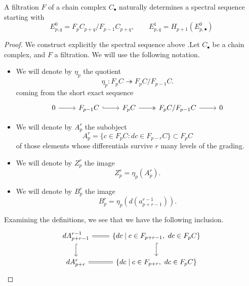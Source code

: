 \documentclass[main.tex]{subfiles}
\begin{document}
\begin{theorem}
  A filtration $F$ of a chain complex $C_{\bullet}$ naturally determines a spectral sequence starting with
  \begin{equation*}
    E^{0}_{p,q} = F_{p}C_{p+q}/F_{p-1}C_{p+q},\qquad E^{1}_{p,q} = H_{p+1}(E^{0}_{p,
    \bullet})
  \end{equation*}
\end{theorem}
\begin{proof}
  We construct explicitly the spectral sequence above .Let $C_{\bullet}$ be a chain complex, and $F$ a filtration. We will use the following notation.
  \begin{itemize}
    \item We will denote by $\eta_{p}$ the quotient
      \begin{equation*}
        \eta_{p}\colon F_{p}C \twoheadrightarrow F_{p}C/F_{p-1}C.
      \end{equation*}
      coming from the short exact sequence
      \begin{equation*}
        \begin{tikzcd}
          0
          \arrow[r]
          & F_{p-1}C
          \arrow[r, hook]
          & F_{p}C
          \arrow[r, two heads]
          & F_{p}C/F_{p-1}C
          \arrow[r]
          & 0
        \end{tikzcd}
      \end{equation*}

    \item We will denote by $A^{r}_{p}$ the subobject
      \begin{equation*}
        A^{r}_{p} = \{c \in F_{p}C\colon dc \in F_{p-r}C\} \subset F_{p}C
      \end{equation*}
      of those elements whose differentials survive $r$ many levels of the grading.

    \item We will denote by $Z^{r}_{p}$ the image
      \begin{equation*}
        Z^{r}_{p} = \eta_{p}(A^{r}_{p}).
      \end{equation*}

    \item We will denote by $B^{r}_{p}$ the image
      \begin{equation*}
        B^{r}_{p} = \eta_{p}(d(a^{r-1}_{p+r-1})).
      \end{equation*}
  \end{itemize}

  Examining the definitions, we see that we have the following inclusion.
  \begin{equation*}
    \begin{tikzcd}
      dA^{r-1}_{p+r-1}
      \arrow[r, equals]
      \arrow[d, hook]
      & \{dc \mid c \in F_{p+r-1},\ dc \in F_{p}C\}
      \arrow[d, hook]
      \\
      dA^{r}_{p+r}
      \arrow[r, equals]
      & \{dc \mid c \in F_{p+r},\ dc \in F_{p}C\}
    \end{tikzcd}
  \end{equation*}


\end{proof}
\end{document}
